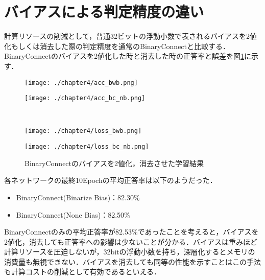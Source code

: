 \section{バイアスによる判定精度の違い}
計算リソースの削減として，普通32ビットの浮動小数で表されるバイアスを2値化もしくは消去した際の判定精度を通常のBinaryConnectと比較する．BinaryConnectのバイアスを2値化した時と消去した時の正答率と誤差を図\ref{fig_acc_loss_2}に示す．
\begin{figure}[htbp]
  \begin{minipage}[b]{0.5\linewidth}
    \centering
    \texttt{[image: ./chapter4/acc\_bwb.png]}
  \end{minipage}
  \begin{minipage}[b]{0.5\linewidth}
    \centering
    \texttt{[image: ./chapter4/acc\_bc\_nb.png]}
  \end{minipage}\\
  \begin{minipage}[b]{0.5\linewidth}
    \centering
    \texttt{[image: ./chapter4/loss\_bwb.png]}
  \end{minipage}
  \begin{minipage}[b]{0.5\linewidth}
    \centering
    \texttt{[image: ./chapter4/loss\_bc\_nb.png]}
  \end{minipage}
  \caption{BinaryConnectのバイアスを2値化，消去させた学習結果}
  \label{fig_acc_loss_2}
\end{figure}

各ネットワークの最終10Epochの平均正答率は以下のようだった．
\begin{itemize}
  \item BinaryConnect(Binarize Bias)：82.30\%
  \item BinaryConnect(None Bias)：82.50\%
\end{itemize}
BinaryConnectのみの平均正答率が82.53\%であったことを考えると，バイアスを2値化，消去しても正答率への影響は少ないことが分かる．バイアスは重みほど計算リソースを圧迫しないが，32bitの浮動小数を持ち，深層化するとメモリの消費量も無視できない．バイアスを消去しても同等の性能を示すことはこの手法も計算コストの削減として有効であるといえる．
